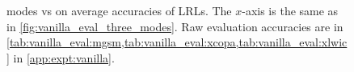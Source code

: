 \begin{figure}[!t]
\begin{subfigure}{.5\textwidth}
        \vspace{-8pt}
        \caption{\xcopa}
        \label{fig:mono_vs_multi:xcopa}
	\end{subfigure}

    \vspace{-10pt}
    \caption{\monolingual modes vs \multilingual on average accuracies of LRLs. The $x$-axis is the same as in \cref{fig:vanilla_eval_three_modes}. 
    Raw evaluation accuracies are in \cref{tab:vanilla_eval:mgsm,tab:vanilla_eval:xcopa,tab:vanilla_eval:xlwic} in \cref{app:expt:vanilla}.}
    \vspace{-5pt}
    \label{fig:mono_vs_multi}
    
\end{figure}
